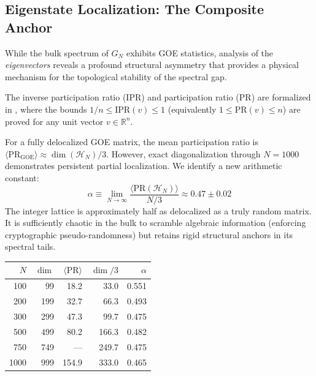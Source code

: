 \subsection{Eigenstate Localization: The Composite Anchor}
\label{sec:localization}

While the bulk spectrum of $G_N$ exhibits GOE statistics, analysis of the
\emph{eigenvectors} reveals a profound structural asymmetry that provides
a physical mechanism for the topological stability of the spectral gap.

The inverse participation ratio (IPR) and participation ratio (PR) are
formalized in , where the bounds
$1/n \leq \mathrm{IPR}(v) \leq 1$ (equivalently $1 \leq \mathrm{PR}(v) \leq n$)
are proved for any unit vector $v \in \mathbb{R}^n$.

\begin{correspondence}
For a fully delocalized GOE matrix, the mean participation ratio is
$\langle \mathrm{PR}_{\mathrm{GOE}} \rangle \approx \dim(\mathcal{H}_N)/3$.
However, exact diagonalization through $N = 1000$ demonstrates persistent
partial localization. We identify a new arithmetic constant:
\begin{equation}
  \alpha \equiv \lim_{N \to \infty}
  \frac{\langle \mathrm{PR}(\mathcal{H}_N) \rangle}{N/3}
  \approx 0.47 \pm 0.02
  \label{eq:alpha}
\end{equation}
The integer lattice is approximately half as delocalized as a truly random
matrix. It is sufficiently chaotic in the bulk to scramble algebraic
information (enforcing cryptographic pseudo-randomness) but retains rigid
structural anchors in its spectral tails.

\begin{center}
\small
\begin{tabular}{@{}rrrrr@{}}
\toprule
$N$ & $\dim$ & $\langle\mathrm{PR}\rangle$ & $\dim/3$ & $\alpha$ \\
\midrule
100  & 99  & 18.2  & 33.0  & 0.551 \\
200  & 199 & 32.7  & 66.3  & 0.493 \\
300  & 299 & 47.3  & 99.7  & 0.475 \\
500  & 499 & 80.2  & 166.3 & 0.482 \\
750  & 749 & ---   & 249.7 & 0.475 \\
1000 & 999 & 154.9 & 333.0 & 0.465 \\
\bottomrule
\end{tabular}
\end{center}
\end{correspondence}

